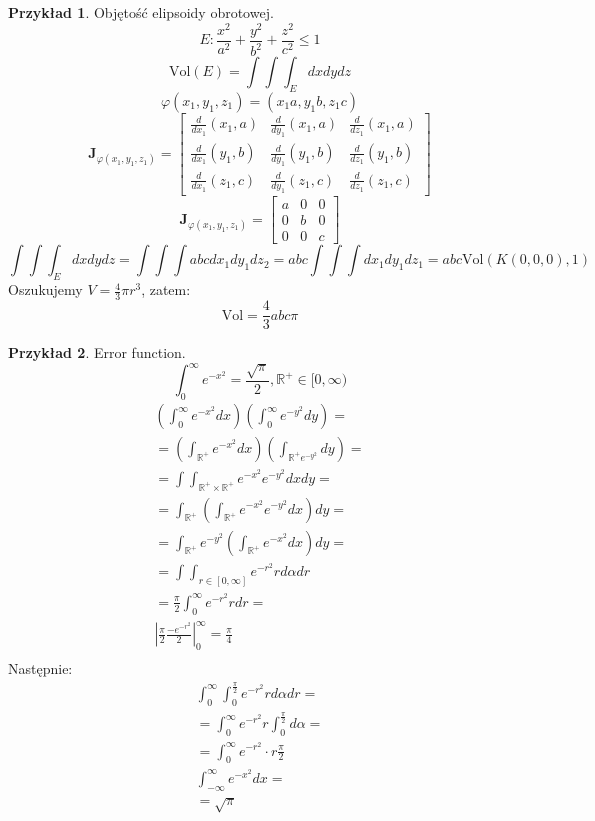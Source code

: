 \documentclass{article}
\theoremstyle{definition}
\theoremstyle{definition}
\theoremstyle{definition}
\newtheorem{pk}{Przykład}[subsection]
\theoremstyle{definition}
\theoremstyle{definition}
\theoremstyle{definition}
\theoremstyle{definition}
\begin{document}
\begin{pk}
    Objętość elipsoidy obrotowej.
    \[E: \frac{x^2}{a^2} + \frac{y^2}{b^2} + \frac{z^2}{c^2} \leq 1\]
    \[\text{Vol}(E) = \int\int\int_{E} dx dy dz\]
    \[\varphi(x_1,y_1,z_1) = (x_1 a, y_1 b, z_1 c)\]
    \[\mathbf{J}_{\varphi(x_1,y_1,z_1)} = \begin{bmatrix}\frac{d}{dx_1}(x_1,a) & \frac{d}{dy_1}(x_1,a) & \frac{d}{dz_1}(x_1,a)\\ \frac{d}{dx_1}(y_1,b) & \frac{d}{dy_1}(y_1,b) & \frac{d}{dz_1}(y_1,b)\\ \frac{d}{dx_1}(z_1,c) & \frac{d}{dy_1}(z_1,c) & \frac{d}{dz_1}(z_1,c)\end{bmatrix}\]
    \[\mathbf{J}_{\varphi(x_1,y_1,z_1)} = \begin{bmatrix}a & 0 & 0\\0 & b & 0\\0 & 0 & c\end{bmatrix}\]
    \[\int\int\int_{E} dx dy dz = \int\int\int abc dx_1 dy_1 dz_2 = abc \int\int\int dx_1dy_1dz_1= abc \text{Vol}\left(K(0,0,0),1\right)\]
    Oszukujemy $V=\frac{4}{3}\pi r^3$, zatem:
    \[\text{Vol}=\frac{4}{3}abc \pi\]
\end{pk}

\begin{pk}
    Error function. 
    \[\int_{0}^{\infty} e^{-x^2} = \frac{\sqrt{\pi}}{2}, \mathbb{R}^{+} \in [0,\infty)\]
    \begin{align}
        \left(\int_{0}^{\infty} e^{-x^2} dx\right)\left(\int_{0}^{\infty} e^{-y^2} dy\right)=\\
        =\left(\int_{\mathbb{R}^{+}} e^{-x^2} dx\right)\left(\int_{\mathbb{R}^{+} e^{-y^2}} dy\right)=\\
        =\int\int_{\mathbb{R}^{+}\times\mathbb{R}^{+}} e^{-x^2} e^{-y^2} dxdy=\\
        =\int_{\mathbb{R}^{+}} \left(\int_{\mathbb{R}^{+}} e^{-x^2} e^{-y^2} dx\right) dy=\\
        =\int_{\mathbb{R}^{+}} e^{-y^2} \left(\int_{\mathbb{R}^{+}} e^{-x^2} dx\right) dy=\\
        =\int\int_{r\in[0,\infty]} e^{-r^2} r d\alpha dr\\
        = \frac{\pi}{2} \int_{0}^{\infty} e^{-r^2} r dr=\\
        \left|\frac{\pi}{2} \frac{-e^{-r^2}}{2} \right|_{0}^{\infty} = \frac{\pi}{4}\\
    \end{align}
    Następnie:
    \begin{align}
        \int_{0}^{\infty} \int_{0}^{\frac{\pi}{2}} e^{-r^2} r d\alpha dr=\\
        =\int_{0}^{\infty} e^{-r^2} r \int_{0}^{\frac{\pi}{2}} d\alpha =\\
        =\int_{0}^{\infty} e^{-r^2} \cdot r \frac{\pi}{2}\\
        \int_{-\infty}^{\infty} e^{-x^2} dx =\\
        =\sqrt{\pi}
    \end{align}
\end{pk}
\end{document}
